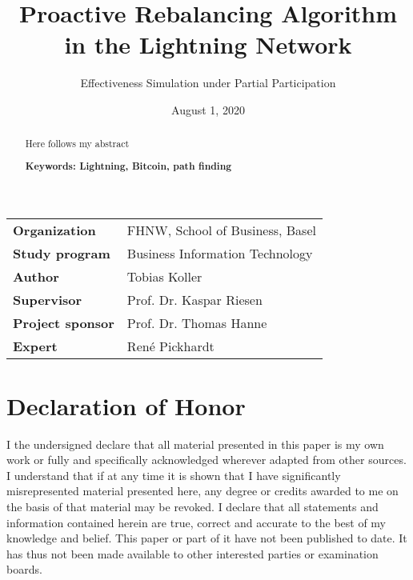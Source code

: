 \documentclass[final]{fhnwreport}       %
\title{Proactive Rebalancing Algorithm in the Lightning Network}                          %
\author{Effectiveness Simulation under Partial Participation}                %
\date{August 1, 2020}                   %
\begin{document}
\maketitle

\vspace*{-1cm}                            %
\vfill
{
\renewcommand\arraystretch{2}
\begin{center}
\begin{tabular}{>{\bf}p{4cm} l}
Organization                  &    FHNW, School of Business, Basel\\
Study program                 &    Business Information Technology\\
Author                        &    Tobias Koller\\
Supervisor                    &    Prof. Dr. Kaspar Riesen\\
Project sponsor               &    Prof. Dr. Thomas Hanne\\
Expert                        &    René Pickhardt
\end{tabular}
\end{center}
}
\clearpage

\thispagestyle{empty}
\begin{abstract}
  Here follows my abstract

  \vspace{2ex}
  \textbf{Keywords: Lightning, Bitcoin, path finding}
\end{abstract}
\vfill

\tableofcontents
\clearpage

\vfill\noindent
\section*{Declaration of Honor}

I the undersigned declare that all material presented in this paper is my own work or fully and specifically acknowledged wherever adapted from other sources. I understand that if at any time it is shown that I have significantly misrepresented material presented here, any degree or credits awarded to me on the basis of that material may be revoked. I declare that all statements and information contained herein are true, correct and accurate to the best of my knowledge and belief. This  paper or part of it have not been published to date. It has thus not been made available to other interested parties or examination boards.  
\end{document}
